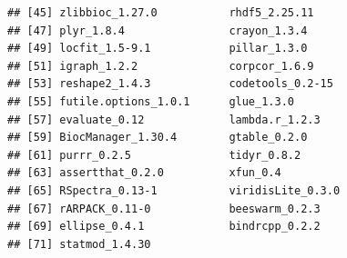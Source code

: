 \documentclass[]{book}
\theoremstyle{definition}
\theoremstyle{definition}
\theoremstyle{definition}
\theoremstyle{remark}
\begin{document}
\begin{verbatim}
## [45] zlibbioc_1.27.0           rhdf5_2.25.11            
## [47] plyr_1.8.4                crayon_1.3.4             
## [49] locfit_1.5-9.1            pillar_1.3.0             
## [51] igraph_1.2.2              corpcor_1.6.9            
## [53] reshape2_1.4.3            codetools_0.2-15         
## [55] futile.options_1.0.1      glue_1.3.0               
## [57] evaluate_0.12             lambda.r_1.2.3           
## [59] BiocManager_1.30.4        gtable_0.2.0             
## [61] purrr_0.2.5               tidyr_0.8.2              
## [63] assertthat_0.2.0          xfun_0.4                 
## [65] RSpectra_0.13-1           viridisLite_0.3.0        
## [67] rARPACK_0.11-0            beeswarm_0.2.3           
## [69] ellipse_0.4.1             bindrcpp_0.2.2           
## [71] statmod_1.4.30
\end{verbatim}


\end{document}
